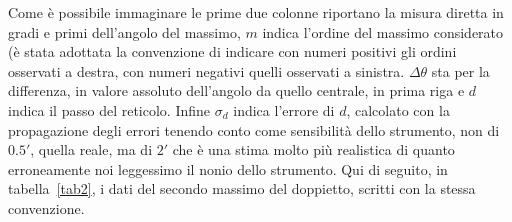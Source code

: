 \documentclass[a4paper,10pt]{article}
\begin{document}
	Come è possibile immaginare le prime due colonne riportano la misura diretta in gradi e primi dell'angolo del massimo, $m$ indica l'ordine del massimo considerato (è stata adottata la convenzione di indicare con numeri positivi gli ordini osservati a destra, con numeri negativi quelli osservati a sinistra. $\Delta \theta$ sta per la differenza, in valore assoluto dell'angolo da quello centrale, in prima riga e $d$ indica il passo del reticolo. Infine $\sigma _d$ indica l'errore di $d$, calcolato con la propagazione degli errori tenendo conto come sensibilità dello strumento, non di $0.5'$, quella reale, ma di $2'$ che è una stima molto più realistica di quanto erroneamente noi leggessimo il nonio dello strumento. Qui di seguito, in tabella~\ref{tab2}, i dati del secondo massimo del doppietto, scritti con la stessa convenzione.
	
	\clearpage
	
\end{document}
